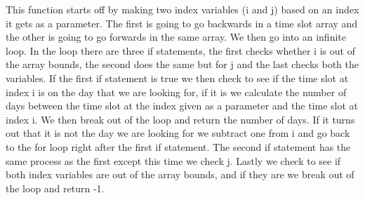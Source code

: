 This function starts off by making two index variables (i and j) based on an index it gets as a parameter. The first is going to go backwards in a time slot array and the other is going to go forwards in the same array. We then go into an infinite loop. In the loop there are three if statements, the first checks whether i is out of the array bounds, the second does the same but for j and the last checks both the variables. If the first if statement is true we then check to see if the time slot at index i is on the day that we are looking for, if it is we calculate the number of days between the time slot at the index given as a parameter and the time slot at index i. We then break out of the loop and return the number of days. If it turns out that it is not the day we are looking for we subtract one from i and go back to the for loop right after the first if statement. The second if statement has the same process as the first except this time we check j. Lastly we check to see if both index variables are out of the array bounds, and if they are we break out of the loop and return -1.